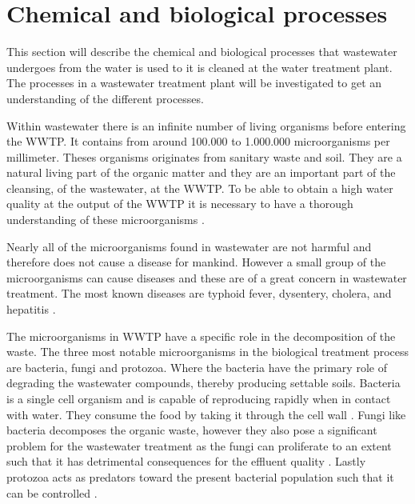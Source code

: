 \section{Chemical and biological processes}\label{se:chemical_process}
This section will describe the chemical and biological processes that wastewater undergoes from the water is used to it is cleaned at the water treatment plant. The processes in a wastewater treatment plant will be investigated to get an understanding of the different processes. %

Within wastewater there is an infinite number of living organisms before entering the WWTP. It contains from around 100.000 to 1.000.000 microorganisms per millimeter. Theses organisms originates from sanitary waste and soil. They are a natural living part of the organic matter and they are an important part of the cleansing, of the wastewater, at the WWTP. To be able to obtain a high water quality at the output of the WWTP it is necessary to have a thorough understanding of these microorganisms \cite{biological_wastewater}. %

Nearly all of the microorganisms found in wastewater are not harmful and therefore does not cause a disease for mankind. However a small group of the microorganisms can cause diseases and these are of a great concern in wastewater treatment. The most known diseases are typhoid fever, dysentery, cholera, and hepatitis \cite{biological_wastewater}.

The microorganisms in WWTP have a specific role in the decomposition of the waste. The three most notable microorganisms in the biological treatment process are bacteria, fungi and protozoa. Where the bacteria have the primary role of degrading the wastewater compounds, thereby producing settable soils. Bacteria is a single cell organism and is capable of reproducing rapidly when in contact with water. They consume the food by taking it through the cell wall \cite{biological_wastewater}. Fungi like bacteria decomposes the organic waste, however they also pose a significant problem for the wastewater treatment as the fungi can proliferate to an extent such that it has detrimental consequences for the effluent quality \cite{fungi_source}. Lastly protozoa acts as predators toward the present bacterial population such that it can be controlled \cite{biological_wastewater}. 

